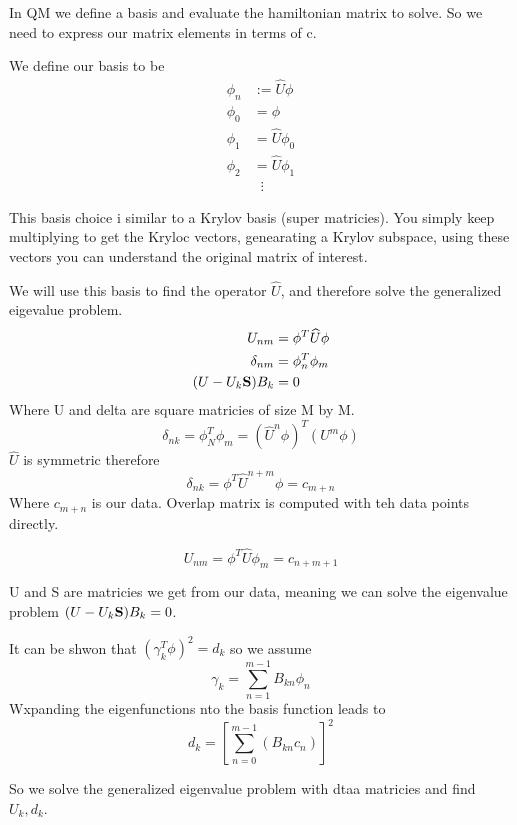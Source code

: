 \documentclass{article}
\newcommand{\be}{\begin{equation}}
\newcommand{\ee}{\end{equation}}
\newcommand{\bS}{\mbox{\bf S}}
\begin{document}
In QM we define a basis and evaluate the hamiltonian matrix to solve.
So we need to express our matrix elements in terms of c.

We define our basis to be
\be
\begin{split}
    \phi_n &:= \widehat{U}\phi\\
    \phi_0 &= \phi\\
    \phi_1 &= \widehat{U}\phi_0\\
    \phi_2 &= \widehat{U}\phi_1\\
    &\;\;\vdots
\end{split}
\ee

This basis choice i similar to a Krylov basis (super matricies).
You simply keep multiplying to get the Kryloc vectors, genearating a Krylov subspace, using these vectors you can understand the original matrix of interest.

We will use this basis to find the operator $\widehat{U}$, and therefore solve the generalized eigevalue problem.
\be
\begin{split}
    U_{nm} &= \phi^T\widehat{U}\phi\\
    \delta_{nm} &= \phi^T_n\phi_m\\
    (U-U_k \bS)B_k&= 0
\end{split}
\ee
Where U and delta are square matricies of size M by M.
\be
\delta_{nk} = \phi_N^T\phi_m = (\widehat{U}^n\phi)^T(U^m\phi)
\ee
$\widehat{U}$ is symmetric therefore
\be
\delta_{nk} = \phi^T\widehat{U}^{n+m}\phi = c_{m+n}
\ee
Where $c_{m+n}$ is our data.
Overlap matrix is computed with teh data points directly.

\be
U_{nm} = \phi^T\widehat{U}\phi_m = c_{n+m+1}
\ee

U and S are matricies we get from our data, meaning we can solve the eigenvalue problem $(U-U_k \bS)B_k= 0$.

It can be shwon that $(\gamma_k^T\phi)^2 = d_k$ so we assume
\be
\gamma_k = \sum_{n=1}^{m-1} B_{kn}\phi_n
\ee
Wxpanding the eigenfunctions nto the basis function leads to
\be
d_k = \left[\sum_{n=0}^{m-1}\left(B_{kn}c_n\right)\right]^2
\ee

So we solve the generalized eigenvalue problem with dtaa matricies and find $U_k, d_k$.
\end{document}
